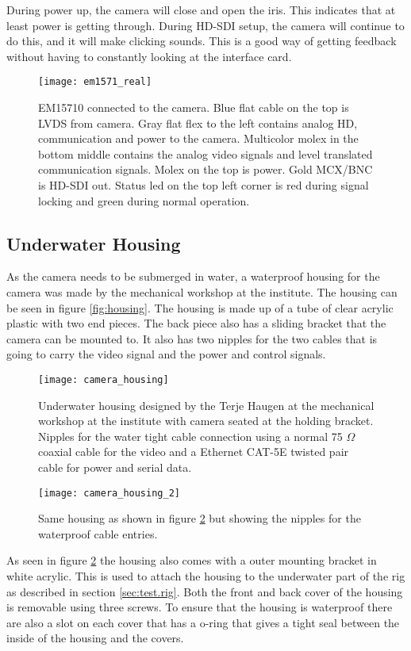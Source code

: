 During power up, the camera will close and open the iris. This indicates that at least power is getting through. During HD-SDI setup, the camera 
will continue to do this, and it will make clicking sounds. This is a good way of getting feedback without having to constantly 
looking at the interface card.

\begin{figure}
 	\centering
 	\texttt{[image: em1571\_real]}
 	\caption{EM15710 connected to the camera. Blue flat cable on the top is LVDS from camera. Gray flat flex to the left contains 
 		analog HD, communication and power to the camera. Multicolor molex in the bottom middle contains the analog video signals and level translated communication signals. Molex on the top is power. Gold MCX/BNC is HD-SDI out. Status led on the top left corner is red during signal locking and green during normal operation.}
 	\label{fig:hd-sdi.card}
\end{figure}

\subsection{Underwater Housing}
As the camera needs to be submerged in water, a waterproof housing for the camera was made by the mechanical workshop at the institute. The housing can 
be seen in figure \vref{fig:housing}. The housing is made up of a tube of clear acrylic plastic with two end pieces. The back piece also
has a sliding bracket that the camera can be mounted to. It also has two nipples for the two cables that is going to carry the video signal and 
the power and control signals. 

\begin{figure}
 	\centering
 	\texttt{[image: camera\_housing]}
 	\caption{Underwater housing designed by the Terje Haugen at the mechanical workshop at the institute with camera seated at the holding bracket. Nipples for the 
 		water tight cable connection using a normal 75 $\Omega$ coaxial cable for the video and a Ethernet CAT-5E twisted pair cable for power and serial data.}
 	\label{fig:housing}
\end{figure}

\begin{figure}
 	\centering
 	\texttt{[image: camera\_housing\_2]}
 	\caption{Same housing as shown in figure \ref{fig:housing} but showing the nipples for the waterproof cable entries.}
 	\label{fig:housing_nipple}
\end{figure}
As seen in figure \ref{fig:housing} the housing also comes with a outer mounting bracket in white acrylic. This is used to attach the housing to the underwater 
part of the rig as described in section \vref{sec:test.rig}. Both the front and back cover of the housing is removable using three screws. To ensure that 
the housing is waterproof there are also a slot on each cover that has a o-ring that gives a tight seal between the inside of the housing and the covers.

